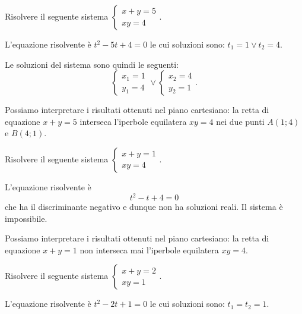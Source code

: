 \begin{exrig}
\begin{esempio}
Risolvere il seguente sistema $\left\{\begin{array}{l}{x+y=5}\\{xy=4}\end{array}\right.$.
\begin{multicols}{2}
L'equazione risolvente è $t^2-5t+4=0$ le cui soluzioni sono: $t_1=1\vee t_2=4$.

Le soluzioni del sistema sono quindi le seguenti: \[ \left\{\begin{array}{l}{x_1=1}\\{y_1=4}\end{array}\right.\vee \left\{\begin{array}{l}{x_2=4}\\{y_2=1}\end{array}\right.. \]

Possiamo interpretare i risultati ottenuti nel piano cartesiano: la retta di equazione $x+y=5$ interseca l'iperbole equilatera ${xy}=4$ nei due punti $A(1;4)$ e $B(4;1)$.
\begin{center}

\end{center}
\end{multicols}
\end{esempio}
\pagebreak
\begin{esempio}
Risolvere il seguente sistema $\left\{\begin{array}{l}{x+y=1}\\{xy=4}\end{array}\right.$.
\begin{multicols}{2}
L'equazione risolvente è \[ t^2-t+4=0 \] che ha il discriminante negativo e dunque non ha soluzioni reali. Il sistema è impossibile.

Possiamo interpretare i risultati ottenuti nel piano cartesiano: la retta di equazione $x+y=1$ non interseca mai l'iperbole equilatera ${xy}=4$.
\begin{center}

\end{center}
\end{multicols}
\end{esempio}
\begin{esempio}
Risolvere il seguente sistema $\left\{\begin{array}{l}{x+y=2}\\{xy=1}\end{array}\right.$.
\begin{multicols}{2}
L'equazione risolvente è $t^2-2t+1=0$ le cui soluzioni sono: $t_1=t_2=1$.


\end{multicols}
\end{esempio}
\end{exrig}
